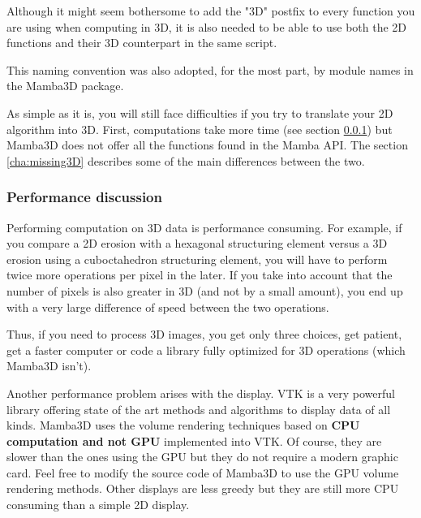 \documentclass[a4paper,10pt,oneside]{article}
\begin{document}
Although it might seem bothersome to add the "3D" postfix to every
function you are using when computing in 3D, it is also needed to be able to
use both the 2D functions and their 3D counterpart in the same script.

This naming convention was also adopted, for the most part, by module
names in the Mamba3D package.

As simple as it is, you will still face difficulties if you try to translate
your 2D algorithm into 3D. First, computations take more time (see section
\ref{cha:perfo3D}) but Mamba3D does not offer all the functions found in
the Mamba API. The section \ref{cha:missing3D} describes some of the 
main differences between the two.

\subsubsection{Performance discussion}
\label{cha:perfo3D}

Performing computation on 3D data is performance consuming. For example, if
you compare a 2D erosion with a hexagonal structuring element versus a 3D
erosion using a cuboctahedron structuring element, you will have to perform
twice more operations per pixel in the later. If you take into account that
the number of pixels is also greater in 3D (and not by a small amount), you end
up with a very large difference of speed between the two operations.

Thus, if you need to process 3D images, you get only three choices, get patient, 
get a faster computer or code a library fully optimized for 3D operations 
(which Mamba3D isn't).

Another performance problem arises with the display. VTK is a very powerful
library offering state of the art methods and algorithms to display 
data of all kinds. Mamba3D uses the volume rendering techniques based on 
\textbf{CPU computation and not GPU} implemented into VTK. Of course, they
are slower than the ones using the GPU but they do not require a modern
graphic card. Feel free to modify the source code of Mamba3D to use the
GPU volume rendering methods. Other displays are less greedy but they
are still more CPU consuming than a simple 2D display.

\end{document}

